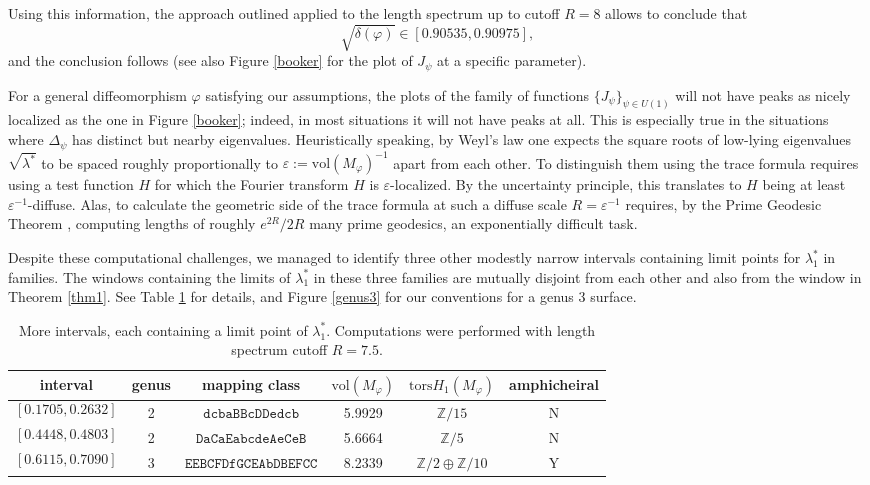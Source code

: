 \documentclass[11pt]{amsart}
\theoremstyle{definition}
\theoremstyle{remark}
\newcommand{\vol}{\mathrm{vol}}
\begin{document}
\par
Using this information, the approach outlined applied to the length spectrum up to cutoff $R=8$  allows to conclude that
\begin{equation*}
\sqrt{\delta(\varphi)}\in[0.90535, 0.90975],
\end{equation*}
and the conclusion follows (see also Figure \ref{booker} for the plot of $J_\psi$ at a specific parameter).
\\
\par
For a general diffeomorphism $\varphi$ satisfying our assumptions, the plots of the family of functions $\{J_\psi\}_{\psi \in U(1)}$ will not have peaks as nicely localized as the one in Figure \ref{booker}; indeed, in most situations it will not have peaks at all. This is especially true in the situations where $\Delta_\psi$ has distinct but nearby eigenvalues. Heuristically speaking, by Weyl's law one expects the square roots of low-lying eigenvalues $\sqrt{\lambda^*}$ to be spaced roughly proportionally to $\varepsilon := \vol(M_\varphi)^{-1}$ apart from each other. To distinguish them using the trace formula requires using a test function $H$ for which the Fourier transform $\widehat{H}$ is $\varepsilon$-localized.  By the uncertainty principle, this translates to $H$ being at least ${\varepsilon}^{-1}$-diffuse.  Alas, to calculate the geometric side of the trace formula at such a diffuse scale $R={\varepsilon}^{-1}$ requires, by the Prime Geodesic Theorem \cite{Cha}, computing lengths of roughly $e^{2R}/2R$ many prime geodesics, an exponentially difficult task. 
\par
Despite these computational challenges, we managed to identify three other modestly narrow intervals containing limit points for $\lambda_1^\ast$ in families.  The windows containing the limits of $\lambda_1^\ast$ in these three families are mutually disjoint from each other and also from the window in Theorem \ref{thm1}.  See Table \ref{moreexamples} for details, and Figure \ref{genus3} for our conventions for a genus $3$ surface.

\begin{table}[ht]
\centering
\begin{tabular}{|c| c |c |c|c|c|}
\hline
{interval} &genus &  mapping class & $\mathrm{vol}(M_\varphi)$  &  $\mathrm{tors} H_1(M_\varphi)$& amphicheiral  \\ [0.5ex] %
\hline
$$[0.1705,0.2632]$$&2&$\mathtt{dcbaBBcDDedcb}$&5.9929&$\mathbb{Z}/15$& N\\
\hline
$$[0.4448,0.4803]$$&2&$\mathtt{DaCaEabcdeAeCeB}$&5.6664&$\mathbb{Z}/5$& N\\
\hline
$$[0.6115,0.7090]$$&3&$\mathtt{EEBCFDfGCEAbDBEFCC}$&8.2339&$\mathbb{Z}/2\oplus\mathbb{Z}/10$& Y\\
\hline
\end{tabular}
\caption{More intervals, each containing a limit point of $\lambda_1^*$. Computations were performed with length spectrum cutoff $R=7.5$.}
\label{moreexamples}
\end{table}
\end{document}
